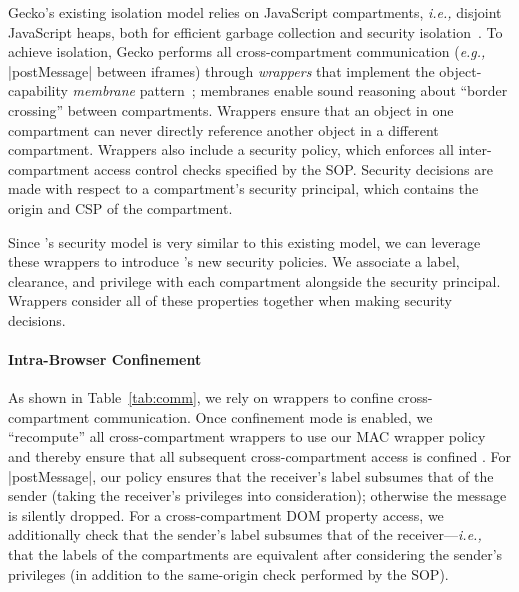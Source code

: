Gecko's existing isolation model relies on JavaScript compartments, \emph{i.e.,}
disjoint JavaScript heaps, both for efficient garbage collection and
security isolation~\cite{wagner2011compartmental}.
%
To achieve isolation, Gecko performs all cross-compartment
communication (\emph{e.g.,} \js|postMessage| between iframes) through
\emph{wrappers} that implement the object-capability \emph{membrane}
pattern~\cite{miller2003paradigm,miller2006robust}; membranes enable
sound reasoning about ``border crossing'' between compartments. 
%
Wrappers ensure that an object in one compartment can
never directly reference another object in a different compartment.
Wrappers also include a security policy,
which enforces all inter-compartment access control checks
specified by the SOP\@.
%
Security decisions are made with respect to a compartment's
security principal, which contains the origin and CSP of the compartment.

Since \sys{}'s security model is very similar to this existing
model, we can leverage these wrappers to introduce \sys{}'s new
security policies.
%
We associate a label, clearance, and privilege with each compartment
alongside the security principal.
%
Wrappers consider all of these properties together when making
security decisions.

\paragraph{Intra-Browser Confinement}
%
As shown in Table~\ref{tab:comm}, we rely on wrappers to
confine cross-compartment communication.
%
Once confinement mode is enabled, we ``recompute'' all
cross-compartment wrappers to use our MAC wrapper policy and thereby
ensure that all subsequent cross-compartment access is confined .
%
%
For \js|postMessage|, our policy ensures that the receiver's label
subsumes that of the sender (taking the receiver's privileges into
consideration); otherwise the message is silently dropped.
%
For a cross-compartment DOM property access, we additionally check
that the sender's label subsumes that of the receiver---\emph{i.e.,}
that the labels of the compartments are equivalent after considering
the sender's privileges (in addition to the same-origin check
performed by the SOP).

